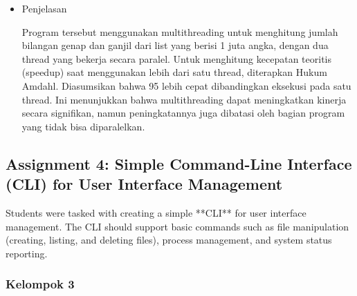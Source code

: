 \documentclass[12pt]{article}
\begin{document}
\begin{itemize}
    \item Penjelasan

Program tersebut menggunakan multithreading untuk menghitung jumlah bilangan genap dan ganjil dari list yang berisi 1 juta angka, dengan dua thread yang bekerja secara paralel. Untuk menghitung kecepatan teoritis (speedup) saat menggunakan lebih dari satu thread, diterapkan Hukum Amdahl. Diasumsikan bahwa 95%
lebih cepat dibandingkan eksekusi pada satu thread. Ini menunjukkan bahwa multithreading dapat meningkatkan kinerja secara signifikan, namun peningkatannya juga dibatasi oleh bagian program yang tidak bisa diparalelkan.
\end{itemize}


\subsection{Assignment 4: Simple Command-Line Interface (CLI) for User Interface Management}
Students were tasked with creating a simple **CLI** for user interface management. The CLI should support basic commands such as file manipulation (creating, listing, and deleting files), process management, and system status reporting.
\subsubsection{Kelompok 3}
\end{document}
